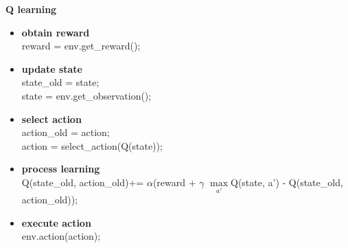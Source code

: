 \documentclass[xcolor=dvipsnames]{beamer}
\begin{document}
\begin{frame}{\bf Q learning}

\begin{itemize}
  \item {\color{red} \bf obtain reward} \\
        reward = env.get\_reward();

  \item {\color{red} \bf update state} \\
        state\_old = state; \\
        state = env.get\_observation(); \\

  \item {\color{red} \bf select action} \\
        action\_old = action; \\
        action = select\_action(Q(state)); \\

  \item {\color{red} \bf process learning} \\
    Q(state\_old, action\_old)+= $\alpha$(reward + $\gamma$ $\max \limits_{a'}$Q(state, a') - Q(state\_old, action\_old));

  \item {\color{red} \bf execute action} \\
    env.action(action);

\end{itemize}


\end{frame}
\end{document}
